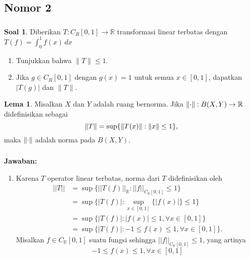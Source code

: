 \documentclass[aspectratio=169]{beamer}
\theoremstyle{definition}
\newtheorem{lema}{Lema}
\newtheorem{soal}{Soal}
\newcommand{\R}{\mathbb{R}}
\begin{document}
\subsection{Nomor 2}
\begin{frame}
  \frametitle{\insertsection}
  \begin{soal}
    Diberikan $T \colon C_R[0,1] \to \mathbb{R}$ transformasi linear terbatas dengan $T(f) = \int_0^1 f(x) \, dx$
    \begin{enumerate}
      \item Tunjukkan bahwa $\|T\| \leq 1$.
      \item Jika $g \in C_R[0,1]$ dengan $g(x) = 1$ untuk semua $x \in [0,1]$, dapatkan $|T(g)|$ dan $\|T\|$.
    \end{enumerate}
  \end{soal}
  \begin{lema}
    Misalkan \(X\) dan \(Y\) adalah ruang bernorma. Jika \(\norm{\cdot}: B(X,Y) \to \mathbb{R}\) didefinisikan sebagai
    \begin{equation*}
      \norm{T} = \sup\{\norm{T(x)}:\norm{x} \leq 1\},
    \end{equation*}
    maka \(\norm{\cdot}\) adalah norma pada \(B(X,Y)\).
  \end{lema}
\end{frame}


\begin{frame}
  \frametitle{\insertsection}
  \framesubtitle{\insertsubsection}
  \textbf{Jawaban:}
  \begin{enumerate}
    \item Karena $T$ operator linear terbatas, norma dari $T$ didefinisikan oleh
          \begin{align*}
            ||T|| & =\sup\{||T(f)||_\R:||f||_{C_\R[0,1]}\leq1\}          \\
                  & =\sup\{|T(f)|:\sup_{x\in[0,1]}\{|f(x)|\}\leq1\}      \\
                  & =\sup\{|T(f)|:|f(x)|\leq1,\forall x\in[0,1]\}        \\
                  & =\sup\{|T(f)|:-1\leq f(x)\leq1,\forall x\in [0,1]\}.
          \end{align*}
          Misalkan $f\in C_\R[0,1]$ suatu fungsi sehingga $||f||_{C_\R[0,1]}\leq1$, yang artinya \[-1\leq f(x)\leq1,\forall x\in [0,1]\]
  \end{enumerate}
\end{frame}
\end{document}
